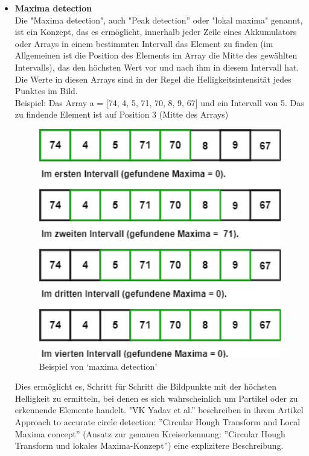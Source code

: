 \begin{itemize}
\item \textbf{Maxima detection}\\
Die "Maxima detection", auch "Peak detection'' oder "lokal maxima" genannt, ist ein Konzept, das es ermöglicht, innerhalb jeder Zeile eines Akkumulators oder Arrays in einem bestimmten Intervall das Element zu finden (im Allgemeinen ist die Position des Elements im Array die Mitte des gewählten Intervalls), das den höchsten Wert vor und nach ihm in diesem Intervall hat.  Die Werte in diesen Arrays sind in der Regel die Helligkeitsintensität jedes Punktes im Bild.\\
Beispiel: Das Array a = [74, 4, 5, 71, 70, 8, 9, 67] und ein Intervall von 5. Das zu findende Element ist auf Position 3 (Mitte des Arrays)


\begin{figure}[H]
    \centering
    \includegraphics[width=1\textwidth]{Grafiken/grundlage/maxima Beispiel.png}
    \caption{Beispiel von `maxima detection'}
\end{figure}

Dies ermöglicht es, Schritt für Schritt die Bildpunkte mit der höchsten Helligkeit zu ermitteln, bei denen es sich wahrscheinlich um Partikel oder zu erkennende Elemente handelt.
"VK Yadav et al.'' beschreiben in ihrem Artikel Approach to accurate circle detection: ''Circular Hough Transform and Local Maxima concept'' (Ansatz zur genauen Kreiserkennung: ''Circular Hough Transform und lokales Maxima-Konzept'') 
\cite{yadav2014approach} eine explizitere Beschreibung.



\end{itemize}

